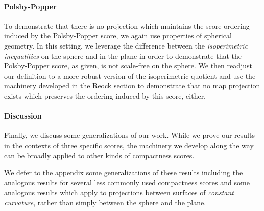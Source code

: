 \paragraph{Polsby-Popper}
To demonstrate that there is no projection which maintains the score ordering induced by the Polsby-Popper score, we again use properties of spherical geometry.  In this setting, we leverage the 
difference between the \textit{isoperimetric inequalities} on the sphere and in the plane in order to 
demonstrate that the Polsby-Popper score, as given, is not scale-free on the sphere.  We then readjust 
our definition to a more robust version of the isoperimetric quotient and use the machinery developed 
in the Reock section to demonstrate that no map projection exists which preserves the ordering induced by this score, either.

\paragraph{Discussion}
Finally, we discuss some generalizations of our work. While we prove our results in the contexts of three specific scores, the machinery we develop along the way can be broadly applied to other kinds of compactness scores.  

We defer to the appendix some generalizations of these results including the analogous results for several less commonly used compactness scores and some analogous results which apply to projections between surfaces of \textit{constant curvature}, rather than simply between the sphere and the plane.


